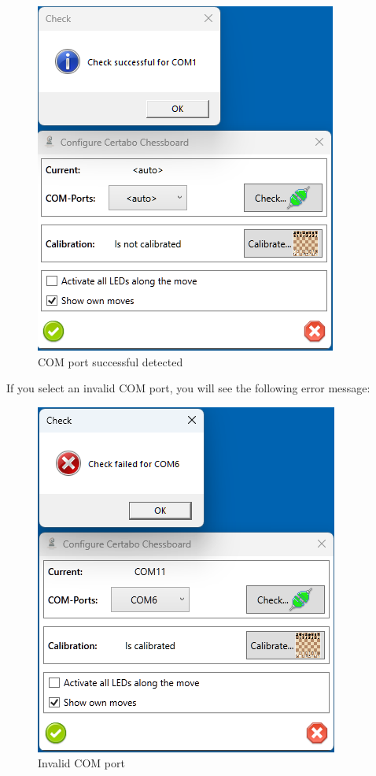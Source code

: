 \documentclass[11pt,a4paper]{article}
\begin{document}
\begin{figure}[H]
	\centering
	\includegraphics[scale=0.9]{Calibrate1.png}
	\caption{COM port successful detected}
	\label{fig:Calibrate1}
\end{figure}

If you select an invalid COM port, you will see the following error message:

\begin{figure}[H]
	\centering
	\includegraphics[scale=0.9]{Calibrate2.png}
	\caption{Invalid COM port }
	\label{fig:Calibrate2}
\end{figure}
\end{document}
